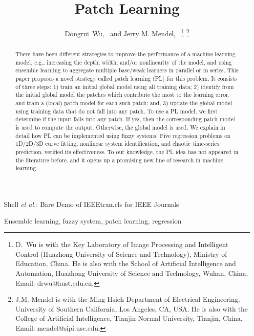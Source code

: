 \documentclass[journal,twocolumn]{IEEEtran}
\begin{document}
\title{Patch Learning}

\author{Dongrui~Wu,~ and Jerry M. Mendel,~
\thanks{D.~Wu is with the Key Laboratory of Image Processing and Intelligent Control (Huazhong University of Science and Technology), Ministry of Education, China. He is also with the School of Artificial Intelligence and Automation, Huazhong University of Science and Technology, Wuhan, China. Email: drwu@hust.edu.cn.}
\thanks{J.M. Mendel is with the Ming Hsieh Department of Electrical Engineering, University of Southern California, Los Angeles, CA, USA. He is also with the College of Artificial Intelligence, Tianjin Normal University, Tianjin, China. Email: mendel@sipi.usc.edu.}}

%
{Shell \MakeLowercase{\textit{et al.}}: Bare Demo of IEEEtran.cls for IEEE Journals}
\maketitle

\begin{abstract}
There have been different strategies to improve the performance of a machine learning model, e.g., increasing the depth, width, and/or nonlinearity of the model, and using ensemble learning to aggregate multiple base/weak learners in parallel or in series. This paper proposes a novel strategy called patch learning (PL) for this problem. It consists of three steps: 1) train an initial global model using all training data; 2) identify  from the initial global model the patches which contribute the most to the learning error, and train a (local) patch model for each such patch; and, 3) update the global model using training data that do not fall into any patch. To use a PL model, we first determine if the input falls into any patch. If yes, then the corresponding patch model is used to compute the output. Otherwise, the global model is used. We explain in detail how PL can be implemented using fuzzy systems. Five regression problems on 1D/2D/3D curve fitting, nonlinear system identification, and chaotic time-series prediction, verified its effectiveness. To our knowledge, the PL idea has not appeared in the literature before, and it opens up a promising new line of research in machine learning.
\end{abstract}

\begin{IEEEkeywords}
Ensemble learning, fuzzy system, patch learning, regression
\end{IEEEkeywords}
\end{document}
